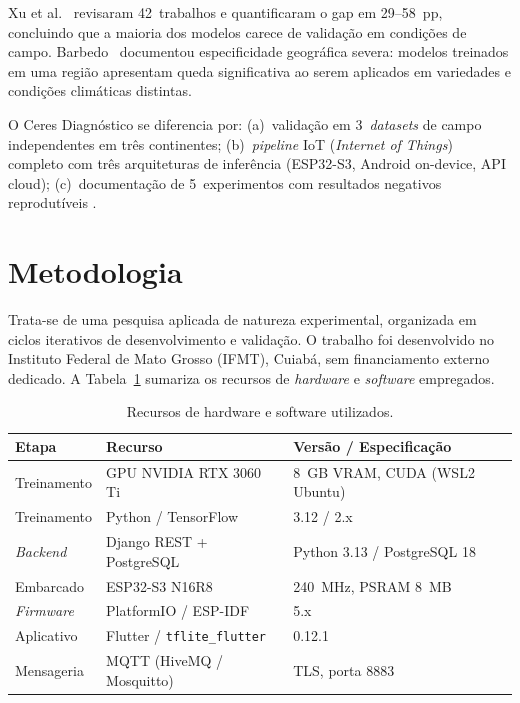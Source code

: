 \documentclass[12pt]{article}
\begin{document}
Xu et al.~\cite{xu2024} revisaram 42~trabalhos e quantificaram o gap em 29--58~pp,
concluindo que a maioria dos modelos carece de validação em condições de campo.
Barbedo~\cite{barbedo2019} documentou especificidade geográfica severa: modelos
treinados em uma região apresentam queda significativa ao serem aplicados em
variedades e condições climáticas distintas.

O Ceres Diagnóstico se diferencia por: (a)~validação em 3~\textit{datasets} de campo
independentes em três continentes; (b)~\textit{pipeline} IoT (\textit{Internet of
Things}) completo com três arquiteturas de inferência (ESP32-S3, Android on-device,
API cloud); (c)~documentação de
5~experimentos com resultados negativos reprodutíveis \cite{pineau2021}.


\section{Metodologia}

Trata-se de uma pesquisa aplicada de natureza experimental, organizada em ciclos
iterativos de desenvolvimento e validação. O trabalho foi desenvolvido no Instituto
Federal de Mato Grosso (IFMT), Cuiabá, sem financiamento externo dedicado.
A Tabela~\ref{tab:recursos} sumariza os recursos de \textit{hardware} e
\textit{software} empregados.

\begin{table}[ht]
\centering
\caption{Recursos de hardware e software utilizados.}
\label{tab:recursos}
\begin{tabular}{@{}lll@{}}
\toprule
\textbf{Etapa} & \textbf{Recurso} & \textbf{Versão / Especificação} \\
\midrule
Treinamento  & GPU NVIDIA RTX 3060 Ti           & 8~GB VRAM, CUDA (WSL2 Ubuntu) \\
Treinamento  & Python / TensorFlow              & 3.12 / 2.x \\
\textit{Backend} & Django REST + PostgreSQL      & Python 3.13 / PostgreSQL 18 \\
Embarcado    & ESP32-S3 N16R8                   & 240~MHz, PSRAM 8~MB \\
\textit{Firmware} & PlatformIO / ESP-IDF         & 5.x \\
Aplicativo   & Flutter / \texttt{tflite\_flutter} & 0.12.1 \\
Mensageria   & MQTT (HiveMQ / Mosquitto)        & TLS, porta 8883 \\
\bottomrule
\end{tabular}
\end{table}
\end{document}
